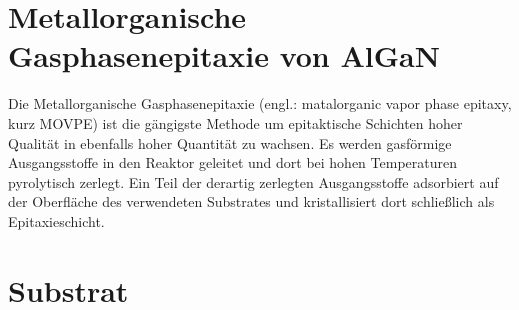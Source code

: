 \thispagestyle{fancy}


\section{Metallorganische Gasphasenepitaxie von AlGaN}

Die Metallorganische Gasphasenepitaxie (engl.: matalorganic vapor phase epitaxy, kurz MOVPE) ist die gängigste Methode um epitaktische Schichten hoher Qualität in ebenfalls hoher Quantität zu wachsen. Es werden gasförmige Ausgangsstoffe in den Reaktor geleitet und dort bei hohen Temperaturen pyrolytisch zerlegt. Ein Teil der derartig zerlegten Ausgangsstoffe adsorbiert auf der Oberfläche des verwendeten Substrates und kristallisiert dort schließlich als Epitaxieschicht. 

\section{Substrat}

